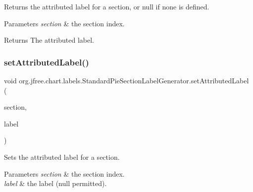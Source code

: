 Returns the attributed label for a section, or {\ttfamily null} if none is defined.


\begin{DoxyParams}{Parameters}
{\em section} & the section index.\\
\hline
\end{DoxyParams}
\begin{DoxyReturn}{Returns}
The attributed label. 
\end{DoxyReturn}
\mbox{\label{classorg_1_1jfree_1_1chart_1_1labels_1_1_standard_pie_section_label_generator_a6aa94eabd64ee4652031696b0a3c5797}} 
\subsubsection{\texorpdfstring{set\+Attributed\+Label()}{setAttributedLabel()}}
{\footnotesize\ttfamily void org.\+jfree.\+chart.\+labels.\+Standard\+Pie\+Section\+Label\+Generator.\+set\+Attributed\+Label (\begin{DoxyParamCaption}\item[{int}]{section,  }\item[{Attributed\+String}]{label }\end{DoxyParamCaption})}

Sets the attributed label for a section.


\begin{DoxyParams}{Parameters}
{\em section} & the section index. \\
\hline
{\em label} & the label ({\ttfamily null} permitted). \\
\hline
\end{DoxyParams}


